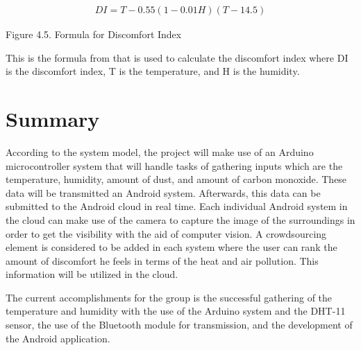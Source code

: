 \begin{center}
\begin{eqnarray}
DI = T-0.55(1-0.01H)(T-14.5)
\label{Discomfort Index}
\end{eqnarray}
\end{center}
\begin{center}
Figure 4.5. Formula for Discomfort Index
\end{center}

This is the formula from \cite{Calculator} that is used to calculate the discomfort index where DI is the discomfort index, T is the temperature, and H is the humidity.

\section{Summary}

According to the system model, the project will make use of an Arduino microcontroller system that will handle tasks of gathering inputs which are the temperature, humidity, amount of dust, and amount of carbon monoxide. These data will be transmitted an Android system. Afterwards, this data can be submitted  to the Android cloud in real time. Each individual Android system in the cloud can make use of the camera to capture the image of the surroundings in order to get the visibility with the aid of computer vision. A crowdsourcing element is considered to be added in each system where the user can rank the amount of discomfort he feels in terms of the heat and air pollution. This information will be utilized in the cloud.

The current accomplishments for the group is the successful gathering of the temperature and humidity with the use of the Arduino system and the DHT-11 sensor, the use of the Bluetooth module for transmission, and the development of the Android application. 